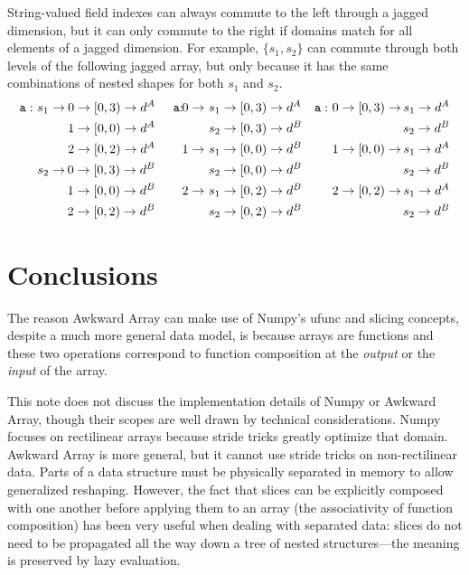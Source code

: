 \documentclass[12pt]{article}
\begin{document}
String-valued field indexes can always commute to the left through a jagged dimension, but it can only commute to the right if domains match for all elements of a jagged dimension. For example, $\{s_1, s_2\}$ can commute through both levels of the following jagged array, but only because it has the same combinations of nested shapes for both $s_1$ and $s_2$.
\begin{align*}
\texttt{a}: &\ s_1 \to\mbox{\hspace{-0.5 cm}} & 0 \to [0, 3) \to d^A & \mbox{\hspace{0.5 cm}\texttt{a}:\hspace{-0.5 cm}} &\ 0 \to &\ s_1 \to [0, 3) \to d^A & \texttt{a}: &\ 0 \to [0, 3) \to\mbox{\hspace{-0.5 cm}} &\ s_1 \to d^A \\
& &\ 1 \to [0, 0) \to d^A                                  & & &\ s_2 \to [0, 3) \to d^B                                & & & s_2 \to d^B \\
& &\ 2 \to [0, 2) \to d^A                                  & &\ 1 \to &\ s_1 \to [0, 0) \to d^B                         & &\ 1 \to [0, 0) \to\mbox{\hspace{-0.5 cm}} &\ s_1 \to d^A \\
&\ s_2 \to\mbox{\hspace{-0.5 cm}} & 0 \to [0, 3) \to d^B                         & & &\ s_2 \to [0, 0) \to d^B                                & & & s_2 \to d^B \\
& &\ 1 \to [0, 0) \to d^B                                  & &\ 2 \to &\ s_1 \to [0, 2) \to d^B                         & &\ 2 \to [0, 2) \to\mbox{\hspace{-0.5 cm}} &\ s_1 \to d^A \\
& &\ 2 \to [0, 2) \to d^B                                  & & &\ s_2 \to [0, 2) \to d^B                                & & & s_2 \to d^B
\end{align*}

\section*{Conclusions}

The reason Awkward Array can make use of Numpy's ufunc and slicing concepts, despite a much more general data model, is because arrays are functions and these two operations correspond to function composition at the {\it output} or the {\it input} of the array.

This note does not discuss the implementation details of Numpy or Awkward Array, though their scopes are well drawn by technical considerations. Numpy focuses on rectilinear arrays because stride tricks greatly optimize that domain. Awkward Array is more general, but it cannot use stride tricks on non-rectilinear data. Parts of a data structure must be physically separated in memory to allow generalized reshaping. However, the fact that slices can be explicitly composed with one another before applying them to an array (the associativity of function composition) has been very useful when dealing with separated data: slices do not need to be propagated all the way down a tree of nested structures---the meaning is preserved by lazy evaluation.
\end{document}
